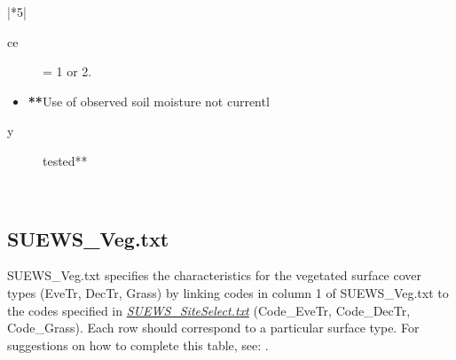 \documentclass[letterpaper,10pt,english]{sphinxmanual}
\begin{document}
\begin{savenotes}
\begin{tabular}[t]{|*{5}{|}}
\begin{itemize}
\end{itemize}
\begin{description}
\item[{ce}] \leavevmode
= 1 or
2.

\end{description}
\begin{itemize}
\item {} 
{\color{red}\bfseries{}**}Use of
observed
soil
moisture
not
currentl

\end{itemize}
\begin{description}
\item[{y}] \leavevmode
tested**

\end{description}
\\
\hline
\end{tabular}
\par
\sphinxattableend\end{savenotes}


\subsection{SUEWS\_Veg.txt}
\label{\detokenize{input_files/SUEWS_SiteInfo/SUEWS_Veg:suews-veg-txt}}\label{\detokenize{input_files/SUEWS_SiteInfo/SUEWS_Veg::doc}}
SUEWS\_Veg.txt specifies the characteristics for the vegetated surface
cover types (EveTr, DecTr, Grass) by linking codes in column 1 of
SUEWS\_Veg.txt to the codes specified in
{\hyperref[\detokenize{input_files/SUEWS_SiteInfo/SUEWS_Veg:SUEWS_SiteSelect.txt}]{\emph{SUEWS\_SiteSelect.txt}}} (Code\_EveTr,
Code\_DecTr, Code\_Grass). Each row should correspond to a particular
surface type. For suggestions on how to complete this table, see:
.
\end{document}
